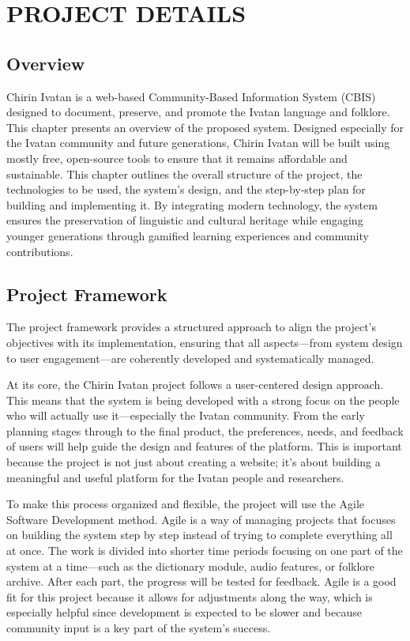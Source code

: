 
\section{PROJECT DETAILS}

        \subsection{Overview}
        Chirin Ivatan is a web-based Community-Based Information System (CBIS) designed to document, preserve, and promote the Ivatan language and folklore. This chapter presents an overview of the proposed system. Designed especially for the Ivatan community and future generations, Chirin Ivatan will be built using mostly free, open-source tools to ensure that it remains affordable and sustainable. This chapter outlines the overall structure of the project, the technologies to be used, the system’s design, and the step-by-step plan for building and implementing it. By integrating modern technology, the system ensures the preservation of linguistic and cultural heritage while engaging younger generations through gamified learning experiences and community contributions.
        \subsection{Project Framework}
        The project framework provides a structured approach to align the project’s objectives with its implementation, ensuring that all aspects—from system design to user engagement—are coherently developed and systematically managed. 

        At its core, the Chirin Ivatan project follows a user-centered design approach. This means that the system is being developed with a strong focus on the people who will actually use it—especially the Ivatan community. From the early planning stages through to the final product, the preferences, needs, and feedback of users will help guide the design and features of the platform. This is important because the project is not just about creating a website; it's about building a meaningful and useful platform for the Ivatan people and researchers. 

        To make this process organized and flexible, the project will use the Agile Software Development method. Agile is a way of managing projects that focuses on building the system step by step instead of trying to complete everything all at once. The work is divided into shorter time periods focusing on one part of the system at a time—such as the dictionary module, audio features, or folklore archive. After each part, the progress will be tested for feedback. Agile is a good fit for this project because it allows for adjustments along the way, which is especially helpful since development is expected to be slower and because community input is a key part of the system’s success.

